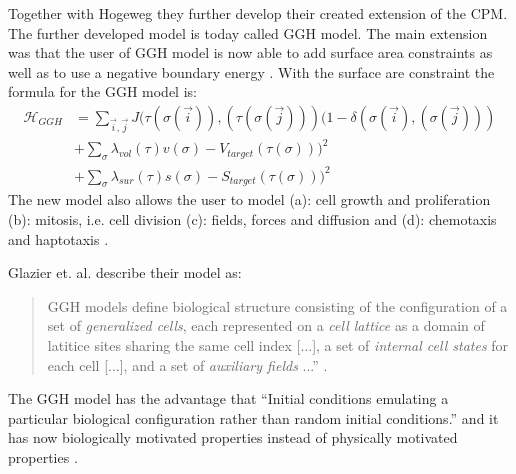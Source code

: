 Together with Hogeweg they further develop their created extension of the \ac{CPM}. The further developed model is today called \ac{GGH} model. The main extension was that the user of \ac{GGH} model is now able to add surface area constraints \cite{Graner1992, Glazier1993, Glazier2007} as well as to use a negative boundary energy \cite{Glazier2007}. With the surface are constraint the formula for the \ac{GGH} model is: 
\begin{equation}
\begin{split}
\mathcal{H}_{GGH} & = \sum_{\vec{i},\vec{j}}^{ }J(\tau(\sigma(\vec{i})),(\tau(\sigma(\vec{j})))(1-\delta(\sigma(\vec{i}),(\sigma(\vec{j}))) \\
		 & + \sum_{\sigma}^{}{\lambda_{vol}(\tau)v(\sigma)-V_{target}(\tau(\sigma)))^2} \\
		 & + \sum_{\sigma}^{}{\lambda_{sur}(\tau)s(\sigma)-S_{target}(\tau(\sigma)))^2}
\end{split}
\end{equation}
The new model also allows the user to model (a): cell growth and proliferation (b): mitosis, i.e. cell division (c): fields, forces and diffusion and (d): chemotaxis and haptotaxis \cite{Glazier2007}.

Glazier et. al. describe their model as: 
\begin{quote}
GGH models define biological structure consisting of the configuration of a set of \textit{generalized cells}, each represented on a \textit{cell lattice} as a domain of latitice sites sharing the same cell index [...], a set of \textit{internal cell states} for each cell [...], and a set of \textit{auxiliary fields} ...” \cite{Glazier2007}.
\end{quote}

The \ac{GGH} model has the advantage that “Initial conditions emulating a particular biological configuration rather than random initial conditions.” \cite{Glazier2007} and it has now biologically motivated properties instead of physically motivated properties \cite{Glazier2007}. 


